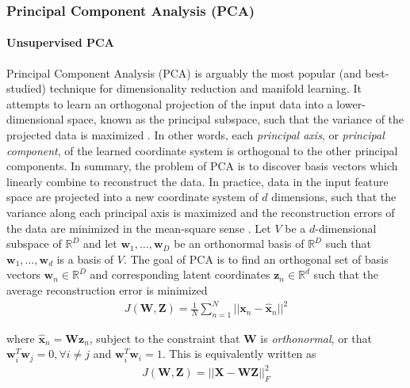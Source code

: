 \subsubsection{Principal Component Analysis (PCA)} \label{sec:PCA}

\paragraph{Unsupervised PCA}
Principal Component Analysis (PCA) is arguably the most popular (and best-studied) technique for dimensionality reduction and manifold learning.  It attempts to learn an orthogonal projection of the input data into a lower-dimensional space, known as the principal subspace, such that the variance of the projected data is maximized \citep{Chao2019RecentAdvancesSupervisedDimRed}.  In other words, each \textit{principal axis}, or \textit{principal component}, of the learned coordinate system is orthogonal to the other principal components.  In summary, the problem of PCA is to discover basis vectors which linearly combine to reconstruct the data.  In practice, data in the input feature space are projected into a new coordinate system of $d$ dimensions, such that the variance along each principal axis is maximized and the reconstruction errors of the data are minimized in the mean-square sense \citep{Thorstensen2009ManifoldThesis}.  Let $V$ be a $d$-dimensional subspace of $\mathbb{R}^{D}$ and let  $\bm{w}_1, \dots, \bm{w}_D$ be an orthonormal basis of $\mathbb{R}^{D}$ such that $\bm{w}_1, \dots, \bm{w}_d$ is a basis of $V$.  The goal of PCA is to find an orthogonal set of basis vectors $\bm{w}_n \in \mathbb{R}^{D}$ and corresponding latent coordinates $\bm{z}_n \in \mathbb{R}^{d}$ such that the average reconstruction error is minimized \citep{Murphy2012}
\begin{align}
	J(\bm{W}, \bm{Z}) = \frac{1}{N}\sum_{n=1}^{N} ||\bm{x}_n - \hat{\bm{x}}_n ||^{2}
\end{align}

\noindent
where $\hat{\bm{x}}_n = \bm{W}\bm{z}_{n}$, subject to the constraint that $\bm{W}$ is \textit{orthonormal}, or that $\bm{w}_{i}^{T}\bm{w}_{j}=0,\forall i \neq j$ and $\bm{w}_{i}^{T}\bm{w}_{i}=1 $.  This is equivalently written as 
\begin{align}
		J(\bm{W}, \bm{Z}) = ||\bm{X} - \bm{W}\bm{Z} ||^{2}_{F}
\end{align}

